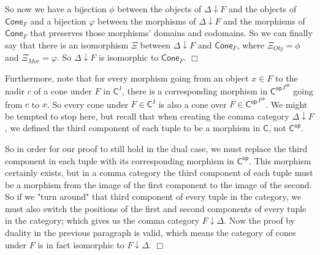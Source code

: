 \documentclass[main.tex]{subfiles}
\begin{document}
So now we have a bijection $ \phi $ between the objects of $ \Delta \downarrow F $ and the objects of $ \mathsf{Cone}_F $ and a bijection $ \varphi $ between the morphisms of $ \Delta \downarrow F $ and the morphisms of $ \mathsf{Cone}_F $ that preserves those morphisms' domains and codomains. So we can finally say that there is an isomorphism $ \Xi $ between $ \Delta \downarrow F $ and $ \mathsf{Cone}_F $, where $ \Xi_{Obj} = \phi $ and $ \Xi_{Mor} = \varphi $. So $ \Delta \downarrow F $ is isomorphic to $ \mathsf{Cone}_F $. $ \Box $

\bigskip %

Furthermore, note that for every morphism going from an object $ x \in F $ to the nadir $ c $ of a cone under $ F $ in $ \mathsf{C^J} $, there is a corresponding morphism in $ \mathsf{{C^{op}}^{J^{op}}} $ going from $ c $ to $ x $. So every cone under $ F \in \mathsf{C^J} $ is also a cone over $ F \in \mathsf{{C^{op}}^{J^{op}}} $. We might be tempted to stop here, but recall that when creating the comma category $ \Delta \downarrow F $, we defined the third component of each tuple to be a morphism in $ \mathsf{C} $, not $ \mathsf{C^{op}} $. 

So in order for our proof to still hold in the dual case, we must replace the third component in each tuple with its corresponding morphism in $ \mathsf{C^{op}} $. This morphism certainly exists, but in a comma category the third component of each tuple must be a morphism from the image of the first component to the image of the second. So if we "turn around" that third component of every tuple in the category, we must also switch the positions of the first and second components of every tuple in the category; which gives us the comma category $ F \downarrow \Delta $. Now the proof by duality in the previous paragraph is valid, which means the category of cones under $ F $ is in fact isomorphic to $ F \downarrow \Delta $. $ \Box $

  
\end{document}

